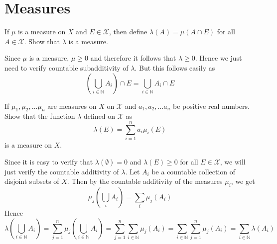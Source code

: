 
\chapter{Measures}

\begin{exercise}[A]
	If $\mu$ is a measure on $X$ and $E \in \mathcal{X}$, then define $\lambda(A) = \mu(A \cap E)$ for all $A \in \mathcal{X}$. Show that $\lambda$ is a measure.
\end{exercise}
\begin{solution}
	Since $\mu$ is a measure, $\mu \ge 0$ and therefore it follows that $\lambda \ge 0$. Hence we just need to verify countable subadditivity of $\lambda$. But this follows easily as $$(\bigcup_{i \in \mathbb{N}} A_i) \cap E = \bigcup_{i \in \mathbb{N}} A_i \cap E$$
\end{solution}

\begin{exercise}[B]
	If $\mu_1, \mu_2, \ldots \mu_n$ are measures on $X$ on $\mathcal{X}$ and $a_1, a_2, \ldots a_n$ be positive real numbers. Show that the function $\lambda$ defined on $\mathcal{X}$ as $$\lambda(E) = \sum_{i=1}^n a_i \mu_i(E)$$ is a measure on $X$.
\end{exercise}
\begin{solution}
	Since it is easy to verify that $\lambda(\emptyset) = 0$ and $\lambda(E) \ge 0$ for all $E \in \mathcal{X}$, we will just verify the countable additivity of $\lambda$. Let $A_i$ be a countable collection of disjoint subsets of $X$. Then by the countable additivity of the measures $\mu_i$, we get $$\mu_j(\bigcup_i A_i) = \sum_i\mu_j(A_i)$$
	Hence $$\lambda(\bigcup_{ i \in \mathbb{N}} A_i) = \sum_{ j =1 }^n \mu_j(\bigcup_{ i \in \mathbb{N}} A_i) = \sum_{j=1}^n\sum_{i\in \mathbb{N}} \mu_j( A_i) = \sum_{ i \in \mathbb{N}}^{} \sum_{j=1}^{n} \mu_j(A_i) = \sum_{ i \in \mathbb{N}}^{} \lambda(A_i)$$
\end{solution}

